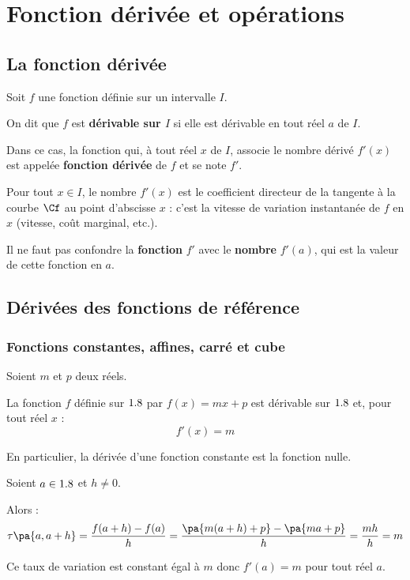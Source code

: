 \chapter{Fonction dérivée et opérations}

\section{La fonction dérivée}

\begin{defin}
	Soit $f$ une fonction définie sur un intervalle $I$.

	On dit que $f$ est \textbf{dérivable sur $I$} si elle est dérivable en tout réel $a$ de $I$.

	Dans ce cas, la fonction qui, à tout réel $x$ de $I$, associe le nombre dérivé $f'(x)$ est appelée \textbf{fonction dérivée} de $f$ et se note $f'$.
\end{defin}

\begin{rem}
	Pour tout $x \in I$, le nombre $f'(x)$ est le coefficient directeur de la tangente à la courbe $\Cf$ au point d'abscisse $x$ : c'est la vitesse de variation instantanée de $f$ en $x$ (vitesse, coût marginal, etc.).

	Il ne faut pas confondre la \textbf{fonction} $f'$ avec le \textbf{nombre} $f'(a)$, qui est la valeur de cette fonction en $a$.
\end{rem}

\section{Dérivées des fonctions de référence}

\subsection{Fonctions constantes, affines, carré et cube}

\begin{propriete}
	Soient $m$ et $p$ deux réels.

	La fonction $f$ définie sur $1.8$ par $f(x) = mx + p$ est dérivable sur $1.8$ et, pour tout réel $x$ :
	\[
		f'(x) = m
	\]

	En particulier, la dérivée d'une fonction constante est la fonction nulle.
\end{propriete}

\begin{demonstration}
	Soient $a \in 1.8$ et $h \neq 0$.

	Alors :
	\[
		\tau\pa{a,a+h} = \dfrac{f(a + h) - f(a)}{h} = \dfrac{\pa{m(a + h) + p} - \pa{ma + p}}{h} = \dfrac{mh}{h} = m
	\]

	Ce taux de variation est constant égal à $m$ donc $f'(a) = m$ pour tout réel $a$.
\end{demonstration}

